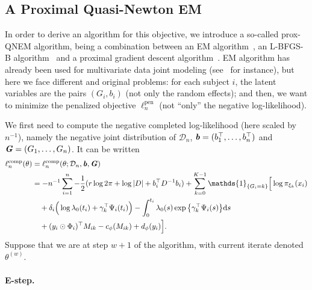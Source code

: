 \documentclass[11pt]{article}
\newcommand{\dd}{\mathrm{d}}
\newcommand{\ind}[1]{\mathds{1}_{#1}}
\newcommand{\cD}{\mathcal D}
\begin{document}
\subsection{A Proximal Quasi-Newton EM}
\label{sec:prox-QNEM}

In order to derive an algorithm for this objective, we introduce a so-called prox-QNEM algorithm, being a combination between an EM algorithm~\citep{dempster1977maximum}, an L-BFGS-B algorithm~\citep{zhu1997algorithm} and a proximal gradient descent algorithm~\citep{beck2009fast}. EM algorithm has already been used for multivariate data joint modeling (see~\citet{lin2002maximum} for instance), but here we face different and original problems: for each subject $i$, the latent variables are the pairs $(G_i, b_i)$ (not only the random effects); and then, we want to minimize the penalized objective $\ell_n^\text{pen}$ (not ``only'' the negative log-likelihood).

We first need to compute the negative completed log-likelihood (here scaled by $n^{-1}$), namely the negative joint distribution of $\cD_n$, $\textbf{\textit{b}} = (b_1^\top, \ldots, b_n^\top)$ and $\textbf{\textit{G}} = (G_1, \ldots, G_n)$.
It can be written
\begin{align*}
  \ell_n^\text{comp}(\theta) &= \ell_n^\text{comp}(\theta ; \cD_n, \textbf{\textit{b}}, \textbf{\textit{G}}) \\ 
  &= - n^{-1} \sum_{i=1}^n -\dfrac12 (r \log 2\pi + \log|D| + b_i^\top D^{-1}b_i) + \sum_{k=0}^{K-1} \ind{\{G_i=k\}} \Big[ \log \pi_{\xi_k}(x_i) \\ 
  & \quad + \delta_i \Big(\log \lambda_0(t_i) + \gamma_k^\top \Psi_i(t_i) \Big) - \int_0^{t_i} \lambda_0(s) \exp \big\{ \gamma_k^\top \Psi_i(s) \big\} \dd s \\
  & \quad + (y_i \odot \Phi_i)^\top M_{ik} - c_\phi(M_{ik}) + d_\phi(y_i) \Big].
\end{align*}
Suppose that we are at step $w + 1$ of the algorithm, with current iterate denoted $\theta^{(w)}$. 

\paragraph*{E-step.}
\end{document}

